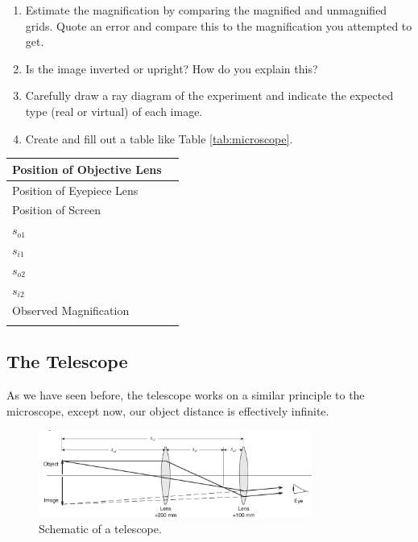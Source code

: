 \begin{enumerate}
\item Estimate the magnification by comparing the magnified and unmagnified grids. Quote an error and compare this to the magnification you attempted to get.

\item Is the image inverted or upright? How do you explain this?

\item Carefully draw a ray diagram of the experiment and indicate the expected type (real or virtual) of each image.

\item Create and fill out a table like Table \ref{tab:microscope}.

\end{enumerate}
\begin{center}
\begin{tabular}{|l|l|}
\hline
Position of Objective Lens & \hspace{4 cm} \\ \hline
Position of Eyepiece Lens &                    \\ \hline
Position of Screen &                    \\ \hline
$s_{o1}$ & \\ \hline
$s_{i1}$ & \\ \hline
$s_{o2}$ & \\ \hline
$s_{i2}$ & \\ \hline
Observed Magnification & \\ \hline
\label{tab:microscope}
\end{tabular}
\end{center}

\subsection{The Telescope}
As we have seen before, the telescope works on a similar principle to the microscope, except now, our object distance is effectively infinite.
\myskip
\begin{figure}[h]
\centering
\includegraphics[width=0.8\textwidth]{./Exp7/pic/image10a.png}
\caption{Schematic of a telescope.}
\end{figure}

